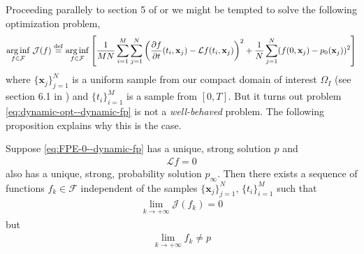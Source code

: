 Proceeding parallely to section 5 of \cite{mandal2023learning} or \cite{sirignano2018dgm} we might be tempted to solve the following optimization problem,
\begin{align}
    \underset{f\in\mathcal F }{\rm arg\,inf}\;\mathcal J(f)\stackrel{\rm def}{=}\underset{f\in\mathcal F }{\rm arg\,inf}\left[\frac{1}{MN}\sum_{i=1}^M\sum_{j=1}^N\left(\frac{\partial f}{\partial t}(t_i, \mathbf x_j)-\mathcal Lf(t_i, \mathbf x_j)\right)^2+ \frac{1}{N}\sum_{j=1}^N(f(0, \mathbf x_j)-p_0(\mathbf x_j))^2\right]\label{eq:dynamic-opt--dynamic-fp}
\end{align}
where $\{\mathbf x_j\}_{j=1}^N$ is a uniform sample from our compact  domain of interest $\Omega_I$ (see section 6.1 in \cite{mandal2023learning}) and $\{t_i\}_{i=1}^M$ is a sample from $[0,T]$.
But it turns out problem \eqref{eq:dynamic-opt--dynamic-fp} is not a \textit{well-behaved} problem. The following proposition explains why this is the case.
\begin{prop}
    Suppose \eqref{eq:FPE-0--dynamic-fp} has a unique, strong solution $p$ and 
    \begin{align}
        \mathcal Lf = 0\label{eq:SFPE--dynamic-fp}
    \end{align}
    also has a unique, strong, probability solution $p_\infty$. 
    Then there exists a sequence of functions $f_k\in\mathcal F$ independent of the samples $\{\mathbf x_j\}_{j=1}^N, \,\{t_i\}_{i=1}^M$ such that \begin{align}
        \lim_{k\to+\infty}\mathcal J(f_k) = 0
\end{align}
    but
    \begin{align}
        \lim_{k\to+\infty}f_k\neq p
    \end{align}\label{prop:failure--dynamic-fp}
\end{prop}
